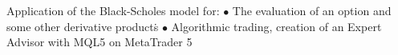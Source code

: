 \documentclass[theme]{cv_einstein}
\begin{document}
\begin{paracol}{2}
\begin{rightcolumn}
            {Application of the Black-Scholes model for: \: \:\:\: \:\:\: \:\:\: \:\:\: \:\:\: \:\:\: \:\:\: \:\:\: \:\:\: \:\:\: \:\:\: \:\:\: \:\:\: \:\:\: \:\:\: \:\:\: \:\:\: \:\:\: \:\:\: \:\:\: \:\:\: \:\:\: \:\:\: \:\:\: \:\:\: \:\:\: \:\:\: \:\:\: \:\:\: \:\:\: \:\:\: \:\:\: \:\:\: \:\:\: \:\:\: \:\:\: \:\:
            $\bullet$ The evaluation
of an option and some other derivative products\.\: \:\: \:\:\: \:\:\: \:\:\: \:\:\: \:\:\: \:\:\: \:\:\: \:\:\: \:\:\: \:\:\: \:\:\: \:\:\: \:\:\: \:\:\: \:\:\: \:\:\: \:\:\: \:\:\: \:\:\: \:\:\: \:\:\: \:\:\: \:\:\: \:\:\: \:\:\: \:\:\: \:\:\: \:\:\: \:\:\: \:\:\: \:\:\: \:\:\: \:\:\: \:\:\: \:\:\: \:\: $\bullet$ Algorithmic trading, creation of an
Expert Advisor with MQL5 on MetaTrader 5}
        \end{rightcolumn}
          
            
        
       
        

\end{paracol}
\end{document}
